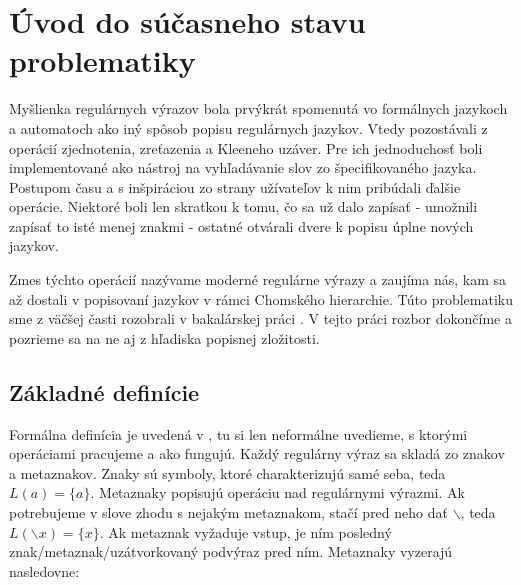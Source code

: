 \chapter[Súčasný stav problematiky]{Úvod do súčasneho stavu problematiky}
\label{chap:uvod}

Myšlienka regulárnych výrazov bola prvýkrát spomenutá vo formálnych jazykoch a automatoch ako iný spôsob popisu regulárnych jazykov. Vtedy pozostávali z operácií zjednotenia, zreťazenia a Kleeneho uzáver. Pre ich jednoduchosť boli implementované ako nástroj na vyhľadávanie slov zo špecifikovaného jazyka. Postupom času a s inšpiráciou zo strany užívateľov k nim pribúdali ďalšie operácie. Niektoré boli len skratkou k tomu, čo sa už dalo zapísať - umožnili zapísať to isté menej znakmi - ostatné otvárali dvere k popisu úplne nových jazykov.

Zmes týchto operácií nazývame moderné regulárne výrazy a zaujíma nás, kam sa až dostali v popisovaní jazykov v rámci Chomského hierarchie. Túto problematiku sme z väčšej časti rozobrali v bakalárskej práci \cite{mojaBak}. V tejto práci rozbor dokončíme a pozrieme sa na ne aj z hľadiska popisnej zložitosti.
\todo

\section{Základné definície}
\label{definicie}

Formálna definícia je uvedená v \cite{mojaBak}, tu si len neformálne uvedieme, s ktorými operáciami pracujeme a ako fungujú. Každý regulárny výraz sa skladá zo znakov a metaznakov. Znaky sú symboly, ktoré charakterizujú samé seba, teda $L(a) = \lbrace a \rbrace$. Metaznaky popisujú operáciu nad regulárnymi výrazmi. Ak potrebujeme v slove zhodu s nejakým metaznakom, stačí pred neho dať $\backslash$, teda $L(\backslash x) = \lbrace x \rbrace$. Ak metaznak vyžaduje vstup, je ním posledný znak/metaznak/uzátvorkovaný podvýraz pred ním. Metaznaky vyzerajú nasledovne:

